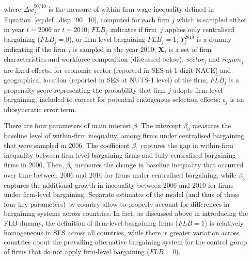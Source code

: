 \documentclass[12pt]{article}
\begin{document}
\noindent where $\Delta w_j^{90/10}$ is the measure of within-firm wage inequality defined in Equation~\eqref{eq:def_disp_90_10}, computed for each firm $j$ which is sampled either in year $t=2006$ or $t=2010$;
$\mathit{FLB}_j$ indicates if firm~$j$ applies only centralised bargaining ($\mathit{FLB}_j=0$), or firm-level bargaining $\mathit{FLB}_j=1$;
$\mathit{Y}^{2010}_j$ is a dummy indicating if the firm $j$ is sampled in the year 2010; $\bm{X}_j$ is a set of firm characteristics and workforce composition (discussed below); $\mathit{sector}_j$ and $\mathit{region}_j$ are fixed-effects, for economic sector (reported in SES at 1-digit NACE) and geographical location (reported in SES at NUTS-1 level) of the firm; $\widehat{\mathit{FLB}}_j$ is a propensity score representing the probability that firm $j$ adopts firm-level bargaining, included to correct for potential endogenous selection effects; $\epsilon_j$ is an idiosyncratic error term. 

There are four parameters of main interest $\beta$. The intercept $\beta_0$ measures the baseline level of within-firm inequality, among firms under centralised bargaining that were sampled in 2006. The coefficient $\beta_1$ captures the gap in within-firm inequality between firm-level bargaining firms and fully centralised bargaining firms in 2006. Then, $\beta_2$ measures the change in baseline inequality that occurred over time between 2006 and 2010 for firms under centralised bargaining, while $\beta_3$ captures the additional growth in inequality between 2006 and 2010 for firms under firm-level bargaining. Separate estimates of the model (and thus of these four key parameters) by country allow to properly account for differences in bargaining systems across countries. In fact, as discussed above in introducing the FLB dummy, the definition of firm-level bargaining firms ($\mathit{FLB}=1$) is relatively homogeneous in SES across all countries, while there is greater variation across countries about the prevailing alternative bargaining system for the control group of firms that do not apply firm-level bargaining ($\mathit{FLB}=0$).
\end{document}
